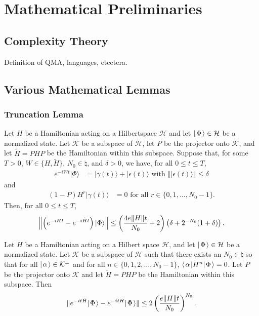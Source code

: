 \documentclass[../thesis-main/thesis-main]{subfiles}
\begin{document}
\chapter{Mathematical Preliminaries}

\section{Complexity Theory}

Definition of QMA, languages, etcetera.

\section{Various Mathematical Lemmas}

\subsection{Truncation Lemma}

\begin{lemma}
\label{lem:trunc}
Let $H$ be a Hamiltonian acting on a Hilbertspace $\mathcal{H}$ and let $|\mspace{2mu} \Phi \mspace{2mu} \rangle\in\mathcal{H}$ be a normalized state. Let
$\mathcal{K}$ be a subspace of $\mathcal{H}$, let $P$ be the projector onto $\mathcal{K}$,
and let $\tilde{H}=PHP$ be the Hamiltonian within this subspace. Suppose
that, for some $T>0$, $W\in\{H,\tilde{H}\}$, $N_0\in\natural$,
and $\delta>0$, we have, for all $0\leq t\leq T$, 
\begin{align*}
e^{-iWt}|\Phi\rangle & = |\gamma(t)\rangle+|\epsilon(t)\rangle \text{ with }
\left\Vert |\epsilon(t)\rangle\right\Vert \leq \delta
\end{align*}
and
\begin{align*}
  (1-P) H^{r}|\gamma(t)\rangle & = 0 \text{ for all } r\in\{0,1,\ldots, N_0-1\}.
\end{align*}
Then, for all $0\leq t \leq T$, 
\[
  \left\|{\left(e^{-iHt}-e^{-i\tilde{H}t}\right)|\Phi\rangle}\right\|
  \leq \left(\frac{4e\|{H}\|t}{N_0} + 2 \right) 
        \left(\delta + 2^{-N_0}(1+\delta)\right).
\]
\end{lemma}

\begin{proposition}
\label{pro:trunc_prop}Let $H$ be a Hamiltonian acting on a Hilbert
space $\mathcal{H}$, and let $|\mspace{2mu} \Phi \mspace{2mu} \rangle\in\mathcal{H}$ be a normalized state. Let
$\mathcal{K}$ be a subspace of $\mathcal{H}$ such that there exists an $N_0\in\natural$
so that for all $|\mspace{2mu} \alpha \mspace{2mu} \rangle\in \mathcal{K}^{\perp}$ and for all $n\in\{0,1,2,\ldots, N_0-1\}$, $\langle\mspace{2mu} \alpha \mspace{2mu} |H^{n}|\mspace{2mu} \Phi \mspace{2mu} \rangle=0$.
Let $P$ be the projector onto $\mathcal{K}$ and let $\tilde{H}=PHP$ be
the Hamiltonian within this subspace.  Then
\[
\|{e^{-it\tilde{H}}|\mspace{2mu} \Phi \mspace{2mu} \rangle-e^{-itH}|\mspace{2mu} \Phi \mspace{2mu} \rangle}\| \leq 2\left(\frac{e\|{H}\|t}{N_0}\right)^{N_0}.
\]
\end{proposition}
\end{document}
